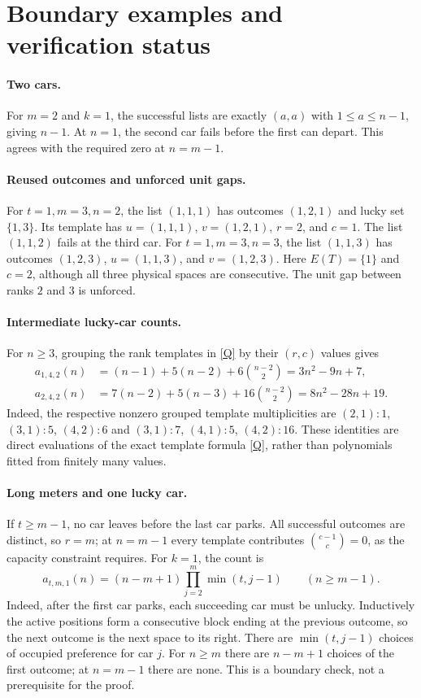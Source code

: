 \documentclass[11pt]{article}
\theoremstyle{definition}
\begin{document}
\section{Boundary examples and verification status}
\paragraph{Two cars.}
For $m=2$ and $k=1$, the successful lists are exactly $(a,a)$ with $1\le a\le n-1$, giving $n-1$. At $n=1$, the second car fails before the first can depart. This agrees with the required zero at $n=m-1$.

\paragraph{Reused outcomes and unforced unit gaps.}
For $t=1,m=3,n=2$, the list $(1,1,1)$ has outcomes $(1,2,1)$ and lucky set $\{1,3\}$. Its template has $u=(1,1,1)$, $v=(1,2,1)$, $r=2$, and $c=1$. The list $(1,1,2)$ fails at the third car. For $t=1,m=3,n=3$, the list $(1,1,3)$ has outcomes $(1,2,3)$, $u=(1,1,3)$, and $v=(1,2,3)$. Here $E(T)=\{1\}$ and $c=2$, although all three physical spaces are consecutive. The unit gap between ranks $2$ and $3$ is unforced.

\paragraph{Intermediate lucky-car counts.}
For $n\ge3$, grouping the rank templates in \eqref{Q} by their $(r,c)$ values gives
\begin{align*}
 a_{1,4,2}(n)&=(n-1)+5(n-2)+6\binom{n-2}{2}
   =3n^2-9n+7,\\
 a_{2,4,2}(n)&=7(n-2)+5(n-3)+16\binom{n-2}{2}
   =8n^2-28n+19.
\end{align*}
Indeed, the respective nonzero grouped template multiplicities are $(2,1):1$, $(3,1):5$, $(4,2):6$ and $(3,1):7$, $(4,1):5$, $(4,2):16$. These identities are direct evaluations of the exact template formula \eqref{Q}, rather than polynomials fitted from finitely many values.

\paragraph{Long meters and one lucky car.}
If $t\ge m-1$, no car leaves before the last car parks. All successful outcomes are distinct, so $r=m$; at $n=m-1$ every template contributes $\binom{c-1}{c}=0$, as the capacity constraint requires. For $k=1$, the count is
\[
 a_{t,m,1}(n)=(n-m+1)\prod_{j=2}^m\min(t,j-1)\qquad(n\ge m-1).
\]
Indeed, after the first car parks, each succeeding car must be unlucky. Inductively the active positions form a consecutive block ending at the previous outcome, so the next outcome is the next space to its right. There are $\min(t,j-1)$ choices of occupied preference for car $j$. For $n\ge m$ there are $n-m+1$ choices of the first outcome; at $n=m-1$ there are none. This is a boundary check, not a prerequisite for the proof.
\end{document}
